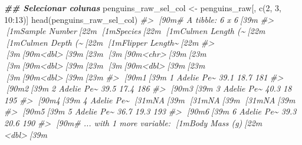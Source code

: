 \documentclass[
]{book}
\newenvironment{Shaded}{\begin{snugshade}}{\end{snugshade}}
\newcommand{\CommentTok}[1]{\textcolor[rgb]{0.37,0.37,0.37}{\textit{#1}}}
\newcommand{\DecValTok}[1]{\textcolor[rgb]{0.06,0.06,0.06}{#1}}
\newcommand{\DocumentationTok}[1]{\textcolor[rgb]{0.37,0.37,0.37}{\textbf{\textit{#1}}}}
\newcommand{\FunctionTok}[1]{\textcolor[rgb]{0,0,0}{#1}}
\newcommand{\NormalTok}[1]{#1}
\newcommand{\OtherTok}[1]{\textcolor[rgb]{0.37,0.37,0.37}{#1}}
\newcommand{\SpecialCharTok}[1]{\textcolor[rgb]{0,0,0}{#1}}
\begin{document}
\begin{Shaded}
\begin{Highlighting}[]
\DocumentationTok{\#\# Selecionar colunas}
\NormalTok{penguins\_raw\_sel\_col }\OtherTok{\textless{}{-}}\NormalTok{ penguins\_raw[, }\FunctionTok{c}\NormalTok{(}\DecValTok{2}\NormalTok{, }\DecValTok{3}\NormalTok{, }\DecValTok{10}\SpecialCharTok{:}\DecValTok{13}\NormalTok{)]}
\FunctionTok{head}\NormalTok{(penguins\_raw\_sel\_col)}
\CommentTok{\#\textgreater{} [90m\# A tibble: 6 x 6[39m}
\CommentTok{\#\textgreater{}   [1m\textasciigrave{}Sample Number\textasciigrave{}[22m [1mSpecies[22m    [1m\textasciigrave{}Culmen Length (\textasciitilde{}[22m [1m\textasciigrave{}Culmen Depth (\textasciitilde{}[22m [1m\textasciigrave{}Flipper Length\textasciitilde{}[22m}
\CommentTok{\#\textgreater{}             [3m[90m\textless{}dbl\textgreater{}[39m[23m [3m[90m\textless{}chr\textgreater{}[39m[23m                  [3m[90m\textless{}dbl\textgreater{}[39m[23m            [3m[90m\textless{}dbl\textgreater{}[39m[23m            [3m[90m\textless{}dbl\textgreater{}[39m[23m}
\CommentTok{\#\textgreater{} [90m1[39m               1 Adelie Pe\textasciitilde{}              39.1             18.7              181}
\CommentTok{\#\textgreater{} [90m2[39m               2 Adelie Pe\textasciitilde{}              39.5             17.4              186}
\CommentTok{\#\textgreater{} [90m3[39m               3 Adelie Pe\textasciitilde{}              40.3             18                195}
\CommentTok{\#\textgreater{} [90m4[39m               4 Adelie Pe\textasciitilde{}              [31mNA[39m               [31mNA[39m                 [31mNA[39m}
\CommentTok{\#\textgreater{} [90m5[39m               5 Adelie Pe\textasciitilde{}              36.7             19.3              193}
\CommentTok{\#\textgreater{} [90m6[39m               6 Adelie Pe\textasciitilde{}              39.3             20.6              190}
\CommentTok{\#\textgreater{} [90m\# ... with 1 more variable: [1mBody Mass (g)[22m \textless{}dbl\textgreater{}[39m}


\end{Highlighting}
\end{Shaded}
\end{document}

